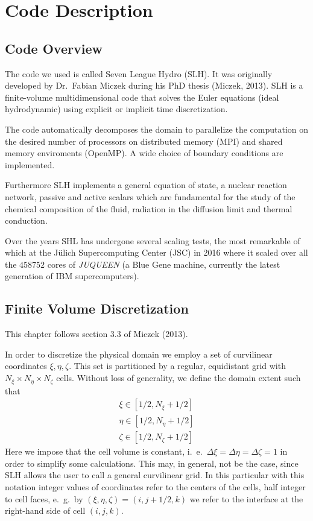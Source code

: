 \chapter{Code Description}
\section{Code Overview}
The code we used is called Seven League Hydro (SLH). It was originally developed by Dr.\ Fabian Miczek during his PhD thesis (Miczek, 2013). SLH is a finite-volume multidimensional code that solves the Euler equations (ideal hydrodynamic) using explicit or implicit time discretization.

The code automatically decomposes the domain to parallelize the computation on the desired number of processors on distributed memory (MPI) and shared memory enviroments (OpenMP). A wide choice of boundary conditions are implemented. 

Furthermore SLH implements a general equation of state, a nuclear reaction network, passive and active scalars which are fundamental for the study of the chemical composition of the fluid, radiation in the diffusion limit and thermal conduction. 

Over the years SHL has undergone several scaling tests, the most remarkable of which at the Jülich Supercomputing Center (JSC) in 2016 where it scaled over all the $458752$ cores of \textit{JUQUEEN} (a Blue Gene machine, currently the latest generation of IBM supercomputers).

\section{Finite Volume Discretization}
This chapter follows section 3.3 of Miczek (2013).

In order to discretize the physical domain we employ a set of curvilinear coordinates $\xi, \eta, \zeta$. This set is partitioned by a regular, equidistant grid with $N_{\xi} \times N_{\eta} \times N_{\zeta}$ cells. Without loss of generality, we define the domain extent such that
\begin{equation}
\begin{split}
\xi \in [1/2, N_{\xi} + 1/2] \\
\eta \in [1/2, N_{\eta} + 1/2] \\
\zeta \in [1/2, N_{\zeta} + 1/2] 
\end{split}
\end{equation}
Here we impose that the cell volume is constant, i.\ e.\ $\Delta \xi = \Delta \eta = \Delta \zeta = 1$ in order to simplify some calculations. This may, in general, not be the case, since SLH allows the user to call a general curvilinear grid. In this particular with this notation integer values of coordinates refer to the centers of the cells, half integer to cell faces, e.\ g.\ by $(\xi, \eta, \zeta) = (i, j + 1/2, k)$ we refer to the interface at the right-hand side of cell $(i, j, k)$.

